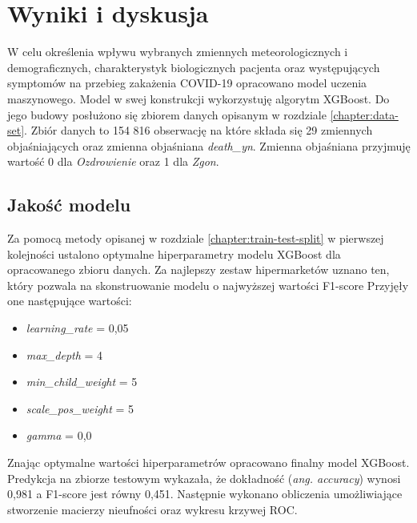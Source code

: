\documentclass[polish, twoside, 12pt, a4paper]{article}
\theoremstyle{definition}
\theoremstyle{plain}
\theoremstyle{remark}
\begin{document}
\clearpage
\section{Wyniki i dyskusja}


W celu określenia wpływu wybranych zmiennych meteorologicznych i demograficznych, charakterystyk biologicznych pacjenta oraz występujących symptomów na przebieg zakażenia COVID-19 opracowano model uczenia maszynowego. Model w swej konstrukcji wykorzystuję algorytm XGBoost. Do jego budowy posłużono się zbiorem danych opisanym w rozdziale \ref{chapter:data-set}. Zbiór danych to 154 816 obserwację na które składa się 29 zmiennych objaśniających oraz zmienna objaśniana \emph{death\_yn}. Zmienna objaśniana przyjmuję wartość 0 dla \emph{Ozdrowienie} oraz 1 dla \emph{Zgon}.

\subsection{Jakość modelu}

Za pomocą metody opisanej w rozdziale \ref{chapter:train-test-split} w pierwszej kolejności ustalono optymalne hiperparametry modelu XGBoost dla opracowanego zbioru danych. Za najlepszy zestaw hipermarketów uznano ten, który pozwala na skonstruowanie modelu o najwyższej wartości F1-score Przyjęły one następujące wartości:
\begin{itemize}[noitemsep]
 \item \emph{learning\_rate} = 0,05
 \item \emph{max\_depth} = 4
 \item \emph{min\_child\_weight} = 5
 \item \emph{scale\_pos\_weight} = 5
 \item \emph{gamma} = 0,0
\end{itemize}

Znając optymalne wartości hiperparametrów opracowano finalny model XGBoost. Predykcja na zbiorze testowym wykazała, że dokładność (\emph{ang. accuracy}) wynosi 0,981 a F1-score jest równy 0,451. Następnie wykonano obliczenia umożliwiające stworzenie macierzy nieufności oraz wykresu krzywej ROC.
\end{document}
